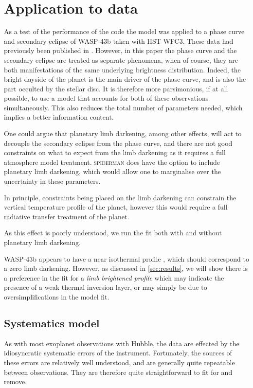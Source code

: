 \documentclass[a4paper,fleqn,usenatbib]{mnras}
\begin{document}
\section{Application to data}\label{sec:Application}

As a test of the performance of the code the model was applied to a phase curve and secondary eclipse of WASP-43b taken with HST WFC3. These data had previously been published in \citet{Stevenson2014}. However, in this paper the phase curve and the secondary eclipse are treated as separate phenomena, when of course, they are both manifestations of the same underlying brightness distribution. Indeed, the bright dayside of the planet is the main driver of the phase curve, and is also the part occulted by the stellar disc. It is therefore more parsimonious, if at all possible, to use a model that accounts for both of these observations simultaneously. This also reduces the total number of parameters needed, which implies a better information content.

One could argue that planetary limb darkening, among other effects, will act to decouple the secondary eclipse from the phase curve, and there are not good constraints on what to expect from the limb darkening as it requires a full atmosphere model treatment. \textsc{spiderman} does have the option to include planetary limb darkening, which would allow one to marginalise over the uncertainty in these parameters. 

In principle, constraints being placed on the limb darkening can constrain the vertical temperature profile of the planet, however this would require a full radiative transfer treatment of the planet.

As this effect is poorly understood, we run the fit both with and without planetary limb darkening.

WASP-43b appears to have a near isothermal profile \citep{Stevenson2014}, which should correspond to a zero limb darkening. However, as discussed in \ref{sec:results}, we will show there is a preference in the fit for a \emph{limb brightened profile} which may indicate the presence of a weak thermal inversion layer, or may simply be due to oversimplifications in the model fit.

\subsection{Systematics model}\label{sec:systematics}

As with most exoplanet observations with Hubble, the data are effected by the idiosyncratic systematic errors of the instrument. Fortunately, the sources of these errors are relatively well understood, and are generally quite repeatable between observations. They are therefore quite straightforward to fit for and remove. 
\end{document}
